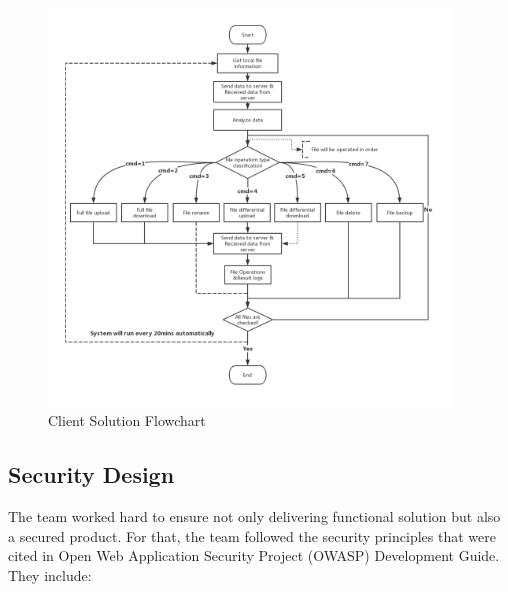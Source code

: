 \documentclass{article}
\begin{document}
\begin{figure}[H]
    \centering
    \includegraphics[width=0.95\textwidth]{flowchart}
    \caption{Client Solution Flowchart}
    \label{fig:flowchart1}
\end{figure}

\hfill \break

\subsection{Security Design}

The team worked hard to ensure not only delivering functional solution but also a secured product. For that, the team followed the security principles that were cited in Open Web Application Security Project (OWASP) Development Guide. They include:
\end{document}
